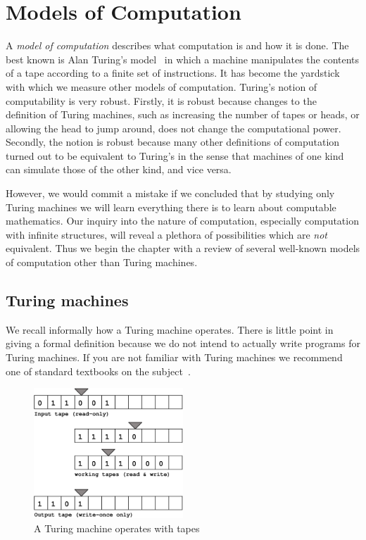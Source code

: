 \chapter{Models of Computation}
\label{cha:models}


A \emph{model of computation} describes what computation is and how it
is done. The best known is Alan Turing's
model~ in which a
machine manipulates the contents of a tape according to a finite set
of instructions. It has become the yardstick with which we measure
other models of computation. Turing's notion of computability is very
robust. Firstly, it is robust because changes to the definition of
Turing machines, such as increasing the number of tapes or heads, or
allowing the head to jump around, does not change the computational
power. Secondly, the notion is robust because many other definitions
of computation turned out to be equivalent to Turing's in the sense
that machines of one kind can simulate those of the other kind, and
vice versa.

However, we would commit a mistake if we concluded that by
studying only Turing machines we will learn everything there is to
learn about computable mathematics. Our inquiry into the nature of
computation, especially computation with infinite structures, will
reveal a plethora of possibilities which are \emph{not} equivalent.
Thus we begin the chapter with a review of several well-known models of
computation other than Turing machines.


\section{Turing machines}
\label{sec:turing-machines}

We recall informally how a Turing machine operates. There is little
point in giving a formal definition because we do not intend to
actually write programs for Turing machines. If you are not familiar
with Turing machines we recommend one of standard textbooks on the
subject~.

\begin{figure}[htbp]
  \centering
  \includegraphics[width=0.5\textwidth]{turing_machine}
  \caption{A Turing machine operates with tapes}
  \label{fig:turing-machine}
\end{figure}

